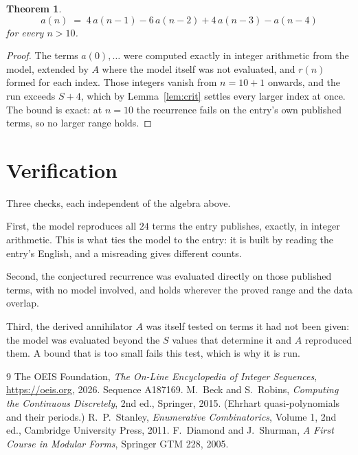 \documentclass[11pt,a4paper]{article}
\theoremstyle{plain}
\newtheorem{theorem}{Theorem}
\theoremstyle{definition}
\begin{document}
\begin{theorem}
\[
a(n)\;=\;4\,a(n-1) - 6\,a(n-2) + 4\,a(n-3) - a(n-4)
\]
for every $n>10$.
\end{theorem}

\begin{proof}
The terms $a(0),\dots$ were computed exactly in integer arithmetic from the model, extended by
$A$ where the model itself was not evaluated, and $r(n)$ formed for each index. Those integers
vanish from $n=10+1$ onwards, and the run exceeds $S+4$, which by
Lemma~\ref{lem:crit} settles every larger index at once. The bound is exact: at $n=10$ the recurrence fails on the entry's own published terms, so no larger range holds.
\end{proof}

\section{Verification}

Three checks, each independent of the algebra above.

First, the model reproduces all $24$ terms the entry publishes, exactly, in integer
arithmetic. This is what ties the model to the entry: it is built by reading the entry's
English, and a misreading gives different counts.

Second, the conjectured recurrence was evaluated directly on those published terms, with no
model involved, and holds wherever the proved range and the data overlap.

Third, the derived annihilator $A$ was itself tested on terms it had not been given: the model
was evaluated beyond the $S$ values that determine it and $A$ reproduced them. A bound that is
too small fails this test, which is why it is run.

\begin{thebibliography}{9}
 The OEIS Foundation, \emph{The On-Line Encyclopedia of Integer
Sequences}, \url{https://oeis.org}, 2026. Sequence A187169.
 M.~Beck and S.~Robins, \emph{Computing the Continuous Discretely},
2nd ed., Springer, 2015. (Ehrhart quasi-polynomials and their periods.)
 R.~P.~Stanley, \emph{Enumerative Combinatorics}, Volume 1, 2nd ed.,
Cambridge University Press, 2011.
 F.~Diamond and J.~Shurman, \emph{A First Course in Modular Forms},
Springer GTM 228, 2005.
\end{thebibliography}
\end{document}
